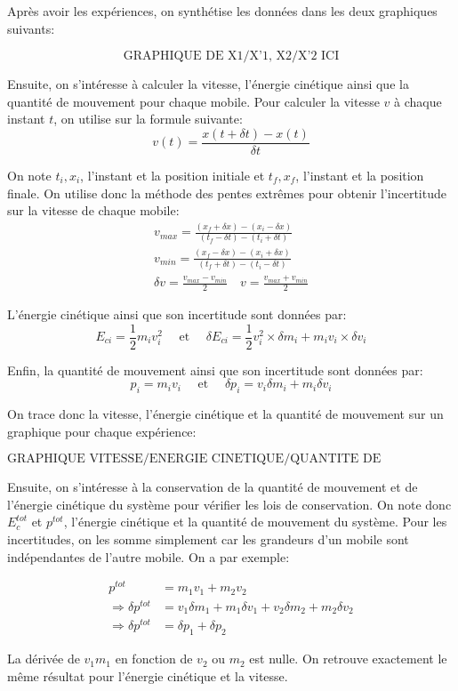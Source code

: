 \documentclass[12pt]{article}
\begin{document}
Après avoir les expériences, on synthétise les données dans les deux graphiques suivants:

\[
    \text{GRAPHIQUE DE X1/X'1, X2/X'2 ICI}
\]
\newpage

Ensuite, on s'intéresse à calculer la vitesse, l'énergie cinétique ainsi que la quantité de mouvement
pour chaque mobile.
Pour calculer la vitesse $v$ à chaque instant $t$, on utilise sur la formule suivante:
\begin{equation}
    v(t) = \frac{x(t + \delta t) - x(t)}{\delta t}
\end{equation}

On note $t_i, x_i$, l'instant et la position initiale et $t_f, x_f$, l'instant et la position finale. On utilise donc la méthode
des pentes extrêmes pour obtenir l'incertitude sur la vitesse de chaque mobile:
\begin{gather*}
    v_{max} = \frac{(x_f + \delta x) - (x_i - \delta x)}{(t_f - \delta t) - (t_i + \delta t)} \\
    v_{min} = \frac{(x_f - \delta x) - (x_i + \delta x)}{(t_f + \delta t) - (t_i - \delta t)} \\
    \delta v = \frac{v_{max} - v_{min}}{2} \quad v = \frac{v_{max} + v_{min}}{2}
\end{gather*}

L'énergie cinétique ainsi que son incertitude sont données par:
\begin{equation}
    E_{ci} = \frac{1}{2}m_iv_i^2 \quad \text{ et } \quad \delta E_{ci} = \frac{1}{2}v_i^2 \times \delta m_i + m_iv_i \times \delta v_i
\end{equation}

Enfin, la quantité de mouvement ainsi que son incertitude sont données par:
\begin{equation}
    p_i = m_iv_i \quad \text{ et } \quad \delta p_i = v_i\delta m_i + m_i\delta v_i
\end{equation}

On trace donc la vitesse, l'énergie cinétique et la quantité de mouvement sur un graphique pour chaque expérience:

\[
    \text{GRAPHIQUE VITESSE/ENERGIE CINETIQUE/QUANTITE DE MOUVEMENT}
\]

\newpage
Ensuite, on s'intéresse à la conservation de la quantité de mouvement et de l'énergie cinétique du système pour
vérifier les lois de conservation. On note donc $E_c^{tot}$ et $p^{tot}$, l'énergie cinétique et la quantité de mouvement du système. 
Pour les incertitudes, on les somme simplement car les grandeurs d'un mobile sont indépendantes de l'autre mobile. On a par exemple:

\begin{align}
    p^{tot} & = m_1v_1 + m_2v_2 \\
    \Rightarrow \delta p^{tot} & = v_1\delta m_1 + m_1\delta v_1 + v_2\delta m_2 + m_2\delta v_2 \\
    \Rightarrow \delta p^{tot} & = \delta p_1 + \delta p_2
\end{align}

La dérivée de $v_1m_1$ en fonction de $v_2$ ou $m_2$ est nulle. On retrouve exactement le même résultat pour l'énergie cinétique et la vitesse.
\end{document}
